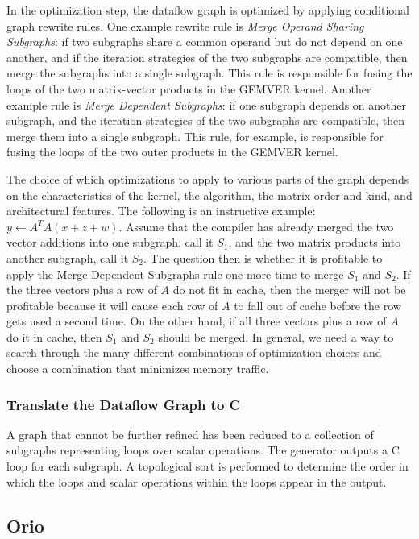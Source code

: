 \documentclass[11pt]{article}
\begin{document}
In the optimization step, the dataflow graph is optimized by applying conditional graph rewrite rules.  One example rewrite rule is \emph{Merge Operand Sharing Subgraphs}: if two subgraphs share a common operand but do not depend on one another, and if the iteration strategies of the two subgraphs are compatible, then merge the subgraphs into a single subgraph.  This rule is responsible for fusing the loops of the two matrix-vector products in the GEMVER kernel.  Another example rule is \emph{Merge Dependent Subgraphs}: if one subgraph depends on another subgraph, and the iteration strategies of the two subgraphs are compatible, then merge them into a single subgraph.  This rule, for example, is responsible for fusing the loops of the two outer products in the GEMVER kernel.

The choice of which optimizations to apply to various parts of the graph depends on the characteristics of the kernel, the algorithm, the matrix order and kind, and architectural features.  The following is an instructive example: $y \gets A^T A (x + z + w)$.  Assume that the compiler has already merged the two vector additions into one subgraph, call it $S_1$, and the two matrix products into another subgraph, call it $S_2$. The question then is whether it is profitable to apply the Merge Dependent Subgraphs rule one more time to merge $S_1$ and $S_2$. If the three vectors plus a row of $A$ do not fit in cache, then the merger will not be profitable because it will cause each row of $A$ to fall out of cache before the row gets used a second time.  On the other hand, if all three vectors plus a row of $A$ do it in cache, then $S_1$ and $S_2$ should be merged.  In general, we need a way to search through the many different combinations of optimization choices and choose a combination that minimizes memory traffic.

\subsubsection{Translate the Dataflow Graph to C}

A graph that cannot be further refined has been reduced to a collection of subgraphs representing loops over scalar operations. The generator outputs a C loop for each subgraph.  A topological sort is performed to determine the order in which the loops and scalar operations within the loops appear in the output.
\subsection{Orio}
\label{sec:orio}
\end{document}
